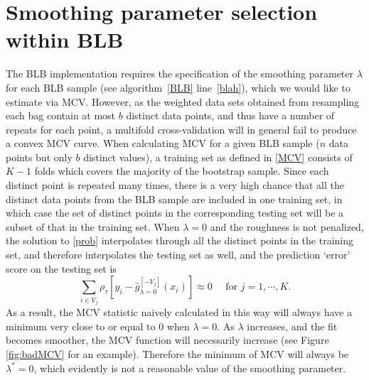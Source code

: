 \documentclass{statsoc}
\begin{document}
\section{Smoothing parameter selection within BLB}\label{lambdasel}
The BLB implementation requires the specification of the smoothing parameter $\lambda$ for each BLB sample (see algorithm~\ref{BLB} line~\ref{blah}), which we would like to estimate via MCV. 
However, as the weighted data sets obtained from resampling each bag contain at most $b$ distinct data points, and thus have a number of repeats for each point, a multifold cross-validation will in general fail to produce a convex MCV curve. 
When calculating MCV for a given BLB sample ($n$ data points but only $b$ distinct values), a training set as defined in \eqref{MCV} consists of $K-1$ folds which covers the majority of the bootstrap sample. Since each distinct point is repeated many times, there is a very high chance that all the distinct data points from the BLB sample are included in one training set, in which case the set of distinct points in the corresponding testing set will be a subset of that in the training set. When $\lambda=0$ and the roughness is not penalized, the solution to \eqref{prob} interpolates through all the distinct points in the training set, and therefore interpolates the testing set as well, and the prediction `error' score on the testing set is 
\begin{equation}
    \sum_{i\in V_j} \rho_{\tau}[y_i-\hat{g}_{\lambda=0}^{[-V_j]}(x_i)]\approx 0 \quad \text{ for }j=1,\cdots, K.
\end{equation}
As a result, the MCV statistic  {naively calculated in this way} will always have a minimum very close to or equal to $0$ when $\lambda=0$. As $\lambda$ increases, and the fit becomes smoother, the MCV function will necessarily increase (see Figure \ref{fig:badMCV} for an example). Therefore the minimum of MCV will always be $\lambda^*=0$, which evidently is not a reasonable value of the smoothing parameter.
\end{document}
